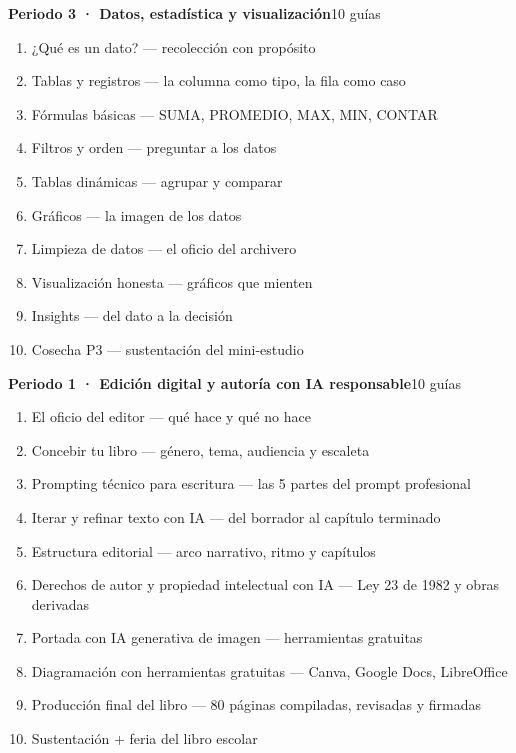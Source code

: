 \noindent\textbf{Periodo 3 · Datos, estadística y visualización}\hfill{\footnotesize\color{vinoInst}10 guías}\par
\begin{enumerate}[leftmargin=2.6em, itemsep=0.6pt, topsep=2pt, parsep=0pt, label=\footnotesize\arabic*.]
\footnotesize
  \item ¿Qué es un dato? --- recolección con propósito
  \item Tablas y registros --- la columna como tipo, la fila como caso
  \item Fórmulas básicas --- SUMA, PROMEDIO, MAX, MIN, CONTAR
  \item Filtros y orden --- preguntar a los datos
  \item Tablas dinámicas --- agrupar y comparar
  \item Gráficos --- la imagen de los datos
  \item Limpieza de datos --- el oficio del archivero
  \item Visualización honesta --- gráficos que mienten
  \item Insights --- del dato a la decisión
  \item Cosecha P3 --- sustentación del mini-estudio
\end{enumerate}

\bigskip
{}
\vspace{1pt}\par\noindent{\color{vinoInst}\rule{\textwidth}{1pt}}
\vspace{3pt}

\noindent\textbf{Periodo 1 · Edición digital y autoría con IA responsable}\hfill{\footnotesize\color{vinoInst}10 guías}\par
\begin{enumerate}[leftmargin=2.6em, itemsep=0.6pt, topsep=2pt, parsep=0pt, label=\footnotesize\arabic*.]
\footnotesize
  \item El oficio del editor --- qué hace y qué no hace
  \item Concebir tu libro --- género, tema, audiencia y escaleta
  \item Prompting técnico para escritura --- las 5 partes del prompt profesional
  \item Iterar y refinar texto con IA --- del borrador al capítulo terminado
  \item Estructura editorial --- arco narrativo, ritmo y capítulos
  \item Derechos de autor y propiedad intelectual con IA --- Ley 23 de 1982 y obras derivadas
  \item Portada con IA generativa de imagen --- herramientas gratuitas
  \item Diagramación con herramientas gratuitas --- Canva, Google Docs, LibreOffice
  \item Producción final del libro --- 80 páginas compiladas, revisadas y firmadas
  \item Sustentación + feria del libro escolar
\end{enumerate}

